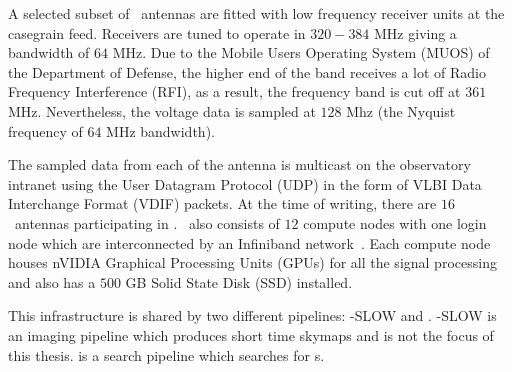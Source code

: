 \par A selected subset of \vla~antennas are fitted with low frequency receiver units at the casegrain feed. 
Receivers are tuned to operate in $320-384$ MHz giving a bandwidth of $64$ MHz. Due to the Mobile Users Operating System (MUOS) of the Department of Defense, the higher end of the band receives a lot of Radio Frequency Interference (RFI), as a result, the frequency band is cut off at $361$ MHz. Nevertheless, the voltage data is sampled at $128$ Mhz (the Nyquist frequency of $64$ MHz bandwidth).
\par The sampled data from each of the antenna is multicast on the observatory intranet using the User Datagram Protocol (UDP) in the form of VLBI Data Interchange Format (VDIF) packets. At the time of writing, there are $16$ \vla~antennas participating in \vlite. \vlite~also consists of $12$ compute nodes with one login node which are interconnected by an Infiniband network~\cite{infiniband}. 
Each compute node houses nVIDIA Graphical Processing Units (GPUs) for all the signal processing and also has a $500$ GB Solid State Disk (SSD) installed.

\par This infrastructure is shared by two different pipelines: \vlite-SLOW and \vf. \vlite-SLOW is an imaging pipeline which produces short time skymaps and is not the focus of this thesis. \vf is a search pipeline which searches for \frb{}s.

